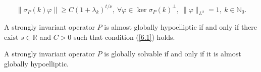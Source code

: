 \documentclass[10pt,a4paper]{amsart}
\begin{document}
		\begin{equation}\label{6.1}
			\|\sigma_P(k)\varphi\|\geq C(1+\lambda_k)^{t/\nu},\ \forall \varphi\in\ker\sigma_P(k)^\perp,\ \|\varphi\|_{L^2}=1,\ k\in\mathbb{N}_0.
		\end{equation}

	\begin{theorem}\label{agh_est}
		A strongly invariant operator $P$ is almost globally hypoelliptic if and only if there exist $s\in\mathbb{R}$ and $C>0$ such that condition (\ref{6.1}) holds.
	\end{theorem}

	\begin{theorem}\label{equiv_gs_agh}
		A strongly invariant operator $P$ is globally solvable if and only if it is almost globally hypoelliptic.
	\end{theorem}
\end{document}
